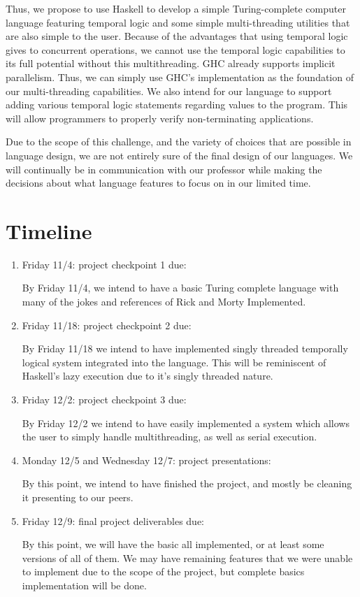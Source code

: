 \documentclass[numbers]{sigplanconf}
\begin{document}
 Thus, we propose to use Haskell to develop a simple Turing-complete
 computer language featuring temporal logic and some simple
 multi-threading utilities that are also simple to the user.
 Because of the advantages that using temporal logic gives to
 concurrent operations, we cannot use the temporal logic 
 capabilities to its full potential without this multithreading.
 GHC already supports implicit parallelism. Thus, we can 
 simply use GHC's implementation as the foundation
 of our multi-threading capabilities. We also intend for our 
 language to support adding various temporal logic
 statements regarding values to the program.
 This will allow programmers to properly verify non-terminating
 applications. 

 Due to the scope of this challenge, and the variety of choices that
 are possible in language design, we are not entirely sure of the
 final design of our languages. We will continually be in communication
 with our professor while making the decisions about what language
 features to focus on in our limited time.

\section{Timeline}
\begin{enumerate}
\item    Friday 11/4: project checkpoint 1 due:

  By Friday 11/4, we intend to have a basic Turing complete language
  with many of the jokes and references of Rick and Morty Implemented.

\item  Friday 11/18: project checkpoint 2 due:

By Friday 11/18 we intend to have implemented singly threaded
temporally logical system integrated into the language. This will be 
reminiscent of Haskell's lazy execution due to it's singly threaded nature.

\item  Friday 12/2: project checkpoint 3 due:
  
  By Friday 12/2 we intend to have easily implemented a system which
  allows the user to simply handle multithreading, as well as serial execution.

\item  Monday 12/5 and Wednesday 12/7: project presentations:

By this point, we intend to have finished the project, and mostly be
cleaning it presenting to our peers.

\item Friday 12/9: final project deliverables due:

By this point, we will have the basic all implemented, or at least
some versions of all of them. We may have remaining features that we
were unable to implement due to the scope of the project, but complete
basics implementation will be done.
\end{enumerate}

\nocite{*}




{}
\end{document}
